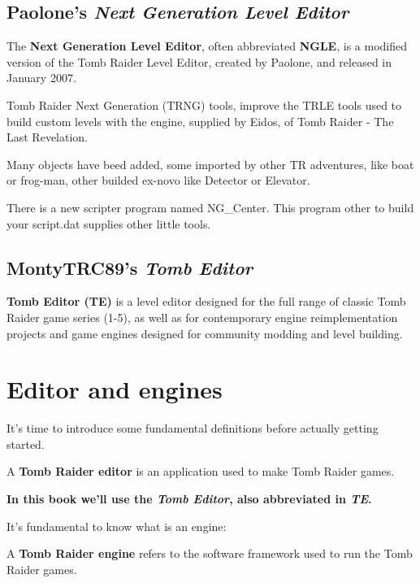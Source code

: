 \section{Paolone's \emph{Next Generation Level Editor}  }
The \textbf{Next Generation Level Editor}, often abbreviated \textbf{NGLE}, is a modified version of the Tomb Raider Level Editor, created by Paolone, and released in January 2007. \cite{wikiraider_NGLE}
\par Tomb Raider Next Generation  (TRNG)  tools, improve the TRLE tools used to build custom levels with the engine, supplied by Eidos, of Tomb Raider - The Last Revelation.
\par Many objects have beed added, some imported by other TR adventures, like boat or frog-man, other builded ex-novo like Detector or Elevator.
\par There is a new scripter program named NG\_Center. This program other to build your script.dat supplies other little tools. \cite{paolone_trng}
\section{MontyTRC89's \emph{Tomb Editor}}
\textbf{Tomb Editor (TE)} is a level editor designed for the full range of classic Tomb Raider game series (1-5), as well as for contemporary engine reimplementation projects and game engines designed for community modding and level building. \cite{TE_github}

\chapter{Editor and engines}

It's time to introduce some fundamental definitions before actually getting started.

\begin{remark}
A \textbf{Tomb Raider editor} is an application used to make Tomb Raider games.
\end{remark}

\textbf{In this book we'll use the \emph{Tomb Editor}, also abbreviated in \emph{TE}.}
\par It's fundamental to know what is an engine:

\begin{remark}
A \textbf{Tomb Raider engine} refers to the software framework used to run the Tomb Raider games.
\end{remark}

